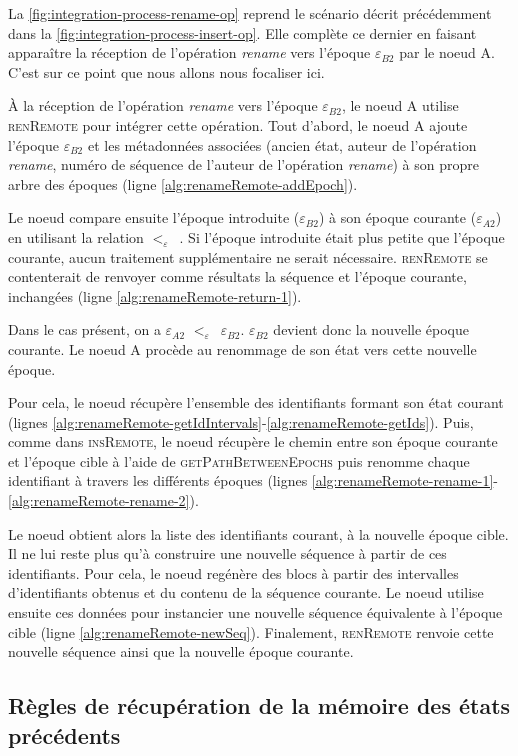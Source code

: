 \documentclass[12pt]{thesul}
\newcommand{\epoch}[1]{$\varepsilon_{#1}$}
\newcommand{\lepoch}{$<_{\varepsilon}$~}
\begin{document}
La \autoref{fig:integration-process-rename-op} reprend le scénario décrit précédemment dans la \autoref{fig:integration-process-insert-op}.
Elle complète ce dernier en faisant apparaître la réception de l'opération \emph{rename} vers l'époque \epoch{B2} par le noeud A.
C'est sur ce point que nous allons nous focaliser ici.

À la réception de l'opération \emph{rename} vers l'époque \epoch{B2}, le noeud A utilise \textsc{renRemote} pour intégrer cette opération.
Tout d'abord, le noeud A ajoute l'époque \epoch{B2} et les métadonnées associées (ancien état, auteur de l'opération \emph{rename}, numéro de séquence de l'auteur de l'opération \emph{rename}) à son propre arbre des époques (ligne \ref{alg:renameRemote-addEpoch}).

Le noeud compare ensuite l'époque introduite (\epoch{B2}) à son époque courante (\epoch{A2}) en utilisant la relation \lepoch.
Si l'époque introduite était plus petite que l'époque courante, aucun traitement supplémentaire ne serait nécessaire.
\textsc{renRemote} se contenterait de renvoyer comme résultats la séquence et l'époque courante, inchangées (ligne \ref{alg:renameRemote-return-1}).

Dans le cas présent, on a \epoch{A2} \lepoch \epoch{B2}.
\epoch{B2} devient donc la nouvelle époque courante.
Le noeud A procède au renommage de son état vers cette nouvelle époque.

Pour cela, le noeud récupère l'ensemble des identifiants formant son état courant (lignes \ref{alg:renameRemote-getIdIntervals}-\ref{alg:renameRemote-getIds}).
Puis, comme dans \textsc{insRemote}, le noeud récupère le chemin entre son époque courante et l'époque cible à l'aide de \textsc{getPathBetweenEpochs} puis renomme chaque identifiant à travers les différents époques (lignes \ref{alg:renameRemote-rename-1}-\ref{alg:renameRemote-rename-2}).

Le noeud obtient alors la liste des identifiants courant, à la nouvelle époque cible.
Il ne lui reste plus qu'à construire une nouvelle séquence à partir de ces identifiants.
Pour cela, le noeud regénère des blocs à partir des intervalles d'identifiants obtenus et du contenu de la séquence courante.
Le noeud utilise ensuite ces données pour instancier une nouvelle séquence équivalente à l'époque cible (ligne \ref{alg:renameRemote-newSeq}).
Finalement, \textsc{renRemote} renvoie cette nouvelle séquence ainsi que la nouvelle époque courante.

\subsection{Règles de récupération de la mémoire des états précédents}
\end{document}
